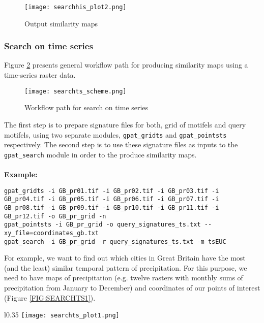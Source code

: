 \begin{figure}[H]
	\centering
	\texttt{[image: searchhis\_plot2.png]}
	\caption{Output similarity maps}
	\label{FIG:SEARCH2}
\end{figure}

\FloatBarrier

\subsubsection{Search on time series}
Figure \ref{FIG:SEARCHTS} presents general workflow path for producing similarity maps using a time-series raster data. 

\begin{figure}[H]
	\centering
	\texttt{[image: searchts\_scheme.png]}
	\caption{Workflow path for search on time series}
	\label{FIG:SEARCHTS}
\end{figure}

The first step is to prepare signature files for both, grid of motifels and query motifels, using two separate modules, {\tt gpat\_gridts} and {\tt gpat\_pointsts} respectively. 
The second step is to use these signature files as inputs to the {\tt gpat\_search} module in order to the produce similarity maps.\\\\

{\bf Example:}

\begin{minipage}{\linewidth}
\begin{lstlisting}
gpat_gridts -i GB_pr01.tif -i GB_pr02.tif -i GB_pr03.tif -i GB_pr04.tif -i GB_pr05.tif -i GB_pr06.tif -i GB_pr07.tif -i GB_pr08.tif -i GB_pr09.tif -i GB_pr10.tif -i GB_pr11.tif -i GB_pr12.tif -o GB_pr_grid -n
gpat_pointsts -i GB_pr_grid -o query_signatures_ts.txt --xy_file=coordinates_gb.txt
gpat_search -i GB_pr_grid -r query_signatures_ts.txt -m tsEUC
\end{lstlisting}
\end{minipage}

For example, we want to find out which cities in Great Britain have the most (and the least) similar temporal pattern of precipitation. 
For this purpose, we need to have maps of precipitation (e.g. twelve rasters with monthly sums of precipitation from January to December) and coordinates of our points of interest (Figure \ref{FIG:SEARCHTS1}).

\newpage

\begin{wrapfigure}{l}{0.35\textwidth}
	\texttt{[image: searchts\_plot1.png]}
	\caption{Location of the points of interest}
	\label{FIG:SEARCHTS1}
\end{wrapfigure}

